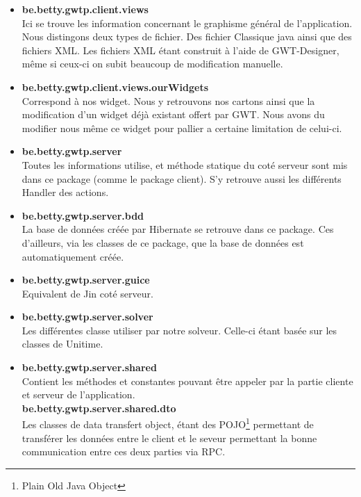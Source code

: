 \begin{itemize}
\item \textbf{be.betty.gwtp.client.views}\\
 Ici se trouve les information concernant le graphisme général de l'application. Nous distingons deux types de fichier. Des fichier Classique java ainsi que des fichiers XML. Les fichiers XML étant construit à l'aide de GWT-Designer, même si ceux-ci on subit beaucoup de modification manuelle.\\
 
 \item \textbf{be.betty.gwtp.client.views.ourWidgets}\\
 Correspond à nos widget. Nous y retrouvons nos cartons ainsi que la modification d'un widget déjà existant offert par GWT. Nous avons du modifier nous même ce widget pour pallier a certaine limitation de celui-ci.\\
 
 \item \textbf{be.betty.gwtp.server}\\
 Toutes les informations utilise, et méthode statique du coté serveur sont mis dans ce package (comme le package client). S'y retrouve aussi les différents Handler des actions.\\
 
 \item \textbf{be.betty.gwtp.server.bdd}\\
  La base de données créée par Hibernate se retrouve dans ce package. Ces d'ailleurs, via les classes de ce package, que la base de données est automatiquement créée.\\
  
 \item \textbf{be.betty.gwtp.server.guice}\\
 Equivalent de Jin coté serveur.\\
 
\item \textbf{be.betty.gwtp.server.solver}\\
Les différentes classe utiliser par notre solveur. Celle-ci étant basée sur les classes de Unitime.\\

\item \textbf{be.betty.gwtp.server.shared}\\
Contient les méthodes et constantes pouvant être appeler par la partie cliente et serveur de l'application.\\

\textbf{be.betty.gwtp.server.shared.dto}\\
Les classes de data transfert object, étant des POJO\footnote{Plain Old Java Object} permettant de transférer les données entre le client et le seveur permettant la bonne communication entre ces deux parties via RPC.\\

\end{itemize}

